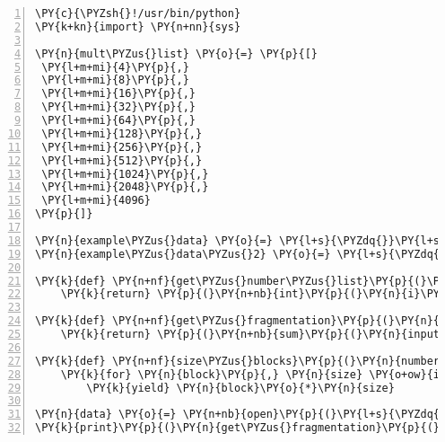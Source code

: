 \begin{Verbatim}[commandchars=\\\{\},numbers=left,firstnumber=1,stepnumber=1]
\PY{c}{\PYZsh{}!/usr/bin/python}
\PY{k+kn}{import} \PY{n+nn}{sys}

\PY{n}{mult\PYZus{}list} \PY{o}{=} \PY{p}{[}
 \PY{l+m+mi}{4}\PY{p}{,}
 \PY{l+m+mi}{8}\PY{p}{,}
 \PY{l+m+mi}{16}\PY{p}{,}
 \PY{l+m+mi}{32}\PY{p}{,}
 \PY{l+m+mi}{64}\PY{p}{,}
 \PY{l+m+mi}{128}\PY{p}{,}
 \PY{l+m+mi}{256}\PY{p}{,}
 \PY{l+m+mi}{512}\PY{p}{,}
 \PY{l+m+mi}{1024}\PY{p}{,}
 \PY{l+m+mi}{2048}\PY{p}{,}
 \PY{l+m+mi}{4096}
\PY{p}{]}

\PY{n}{example\PYZus{}data} \PY{o}{=} \PY{l+s}{\PYZdq{}}\PY{l+s}{Node 0, zone   Normal     75     51     57     16      2      0      0      1      1      2     72}\PY{l+s}{\PYZdq{}}
\PY{n}{example\PYZus{}data\PYZus{}2} \PY{o}{=} \PY{l+s}{\PYZdq{}}\PY{l+s}{Normal    272    144     80     50     33     13      2      1      2      1     71 }\PY{l+s}{\PYZdq{}}

\PY{k}{def} \PY{n+nf}{get\PYZus{}number\PYZus{}list}\PY{p}{(}\PY{n}{input\PYZus{}string}\PY{p}{)}\PY{p}{:}
	\PY{k}{return} \PY{p}{(}\PY{n+nb}{int}\PY{p}{(}\PY{n}{i}\PY{p}{)} \PY{k}{for} \PY{n}{i} \PY{o+ow}{in} \PY{n}{input\PYZus{}string}\PY{o}{.}\PY{n}{split}\PY{p}{(}\PY{l+s}{\PYZdq{}}\PY{l+s}{zone   Normal}\PY{l+s}{\PYZdq{}}\PY{p}{)}\PY{p}{[}\PY{l+m+mi}{1}\PY{p}{]}\PY{o}{.}\PY{n}{split}\PY{p}{(}\PY{p}{)}\PY{p}{)}

\PY{k}{def} \PY{n+nf}{get\PYZus{}fragmentation}\PY{p}{(}\PY{n}{input\PYZus{}blocks}\PY{p}{)}\PY{p}{:}
	\PY{k}{return} \PY{p}{(}\PY{n+nb}{sum}\PY{p}{(}\PY{n}{input\PYZus{}blocks}\PY{p}{)} \PY{o}{\PYZhy{}} \PY{n}{input\PYZus{}blocks}\PY{p}{[}\PY{o}{\PYZhy{}}\PY{l+m+mi}{1}\PY{p}{]}\PY{p}{)} \PY{o}{/} \PY{n+nb}{float}\PY{p}{(}\PY{n+nb}{sum}\PY{p}{(}\PY{n}{input\PYZus{}blocks}\PY{p}{)}\PY{p}{)}

\PY{k}{def} \PY{n+nf}{size\PYZus{}blocks}\PY{p}{(}\PY{n}{number\PYZus{}list}\PY{p}{)}\PY{p}{:}
	\PY{k}{for} \PY{n}{block}\PY{p}{,} \PY{n}{size} \PY{o+ow}{in} \PY{n+nb}{zip}\PY{p}{(}\PY{n}{number\PYZus{}list}\PY{p}{,} \PY{n}{mult\PYZus{}list}\PY{p}{)}\PY{p}{:}
		\PY{k}{yield} \PY{n}{block}\PY{o}{*}\PY{n}{size}

\PY{n}{data} \PY{o}{=} \PY{n+nb}{open}\PY{p}{(}\PY{l+s}{\PYZdq{}}\PY{l+s}{/proc/buddyinfo}\PY{l+s}{\PYZdq{}}\PY{p}{,} \PY{l+s}{\PYZdq{}}\PY{l+s}{r}\PY{l+s}{\PYZdq{}}\PY{p}{)}\PY{o}{.}\PY{n}{read}\PY{p}{(}\PY{p}{)}
\PY{k}{print}\PY{p}{(}\PY{n}{get\PYZus{}fragmentation}\PY{p}{(}\PY{n+nb}{list}\PY{p}{(}\PY{n}{size\PYZus{}blocks}\PY{p}{(}\PY{n}{get\PYZus{}number\PYZus{}list}\PY{p}{(}\PY{n}{data}\PY{p}{)}\PY{p}{)}\PY{p}{)}\PY{p}{)}\PY{p}{)}
\end{Verbatim}
